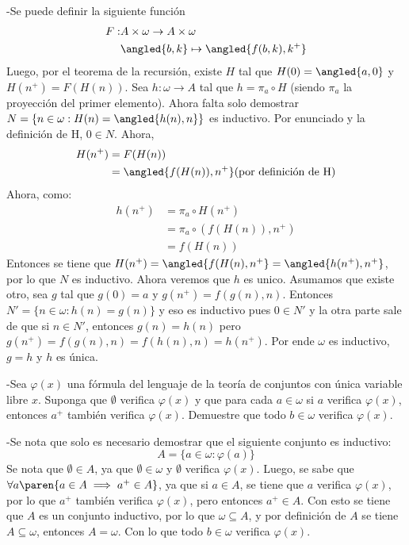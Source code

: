 \begin{sol}
    -Se puede definir la siguiente función
    \begin{align*}
        F: & A\times\omega\rightarrow A\times\omega \\
           & \angled{b,k}\mapsto\angled{f(b,k),k^+} \\
    \end{align*}
    Luego, por el teorema de la recursión, existe \(H\) tal que \(H(0)=\angled{a,0}\) y \(H(n^+)=F(H(n))\). Sea \(h:\omega\rightarrow A\) tal que \(h=\pi_a\circ H\) (siendo \(\pi_a\) la proyección del primer elemento). Ahora falta solo demostrar \(N=\{n\in\omega:H(n)=\angled{h(n),n}\}\) es inductivo. Por enunciado y la definición de H, \(0 \in N\). Ahora,
    \begin{align*}
        H(n^+) & =F(H(n))                                           \\
               & =\angled{f(H(n)),n^+} \text{(por definición de H)}
    \end{align*}
    Ahora, como:
    \begin{align*}
        h(n^+) & = \pi_a\circ H(n^+)        \\
               & = \pi_a\circ (f(H(n)),n^+) \\
               & =f(H(n))
    \end{align*}
    Entonces se tiene que \(H(n^+)=\angled{f(H(n),n^+}=\angled{h(n^+),n^+}\), por lo que \(N\) es inductivo. 
    Ahora veremos que \(h\) es unico. Asumamos que existe otro, sea \(g\) tal que \(g(0)=a\) y \(g(n^+)=f(g(n),n)\). Entonces \(N'=\{n\in\omega:h(n)=g(n)\}\) y eso es inductivo pues \(0 \in N'\) y la otra parte sale de que si \(n \in N'\), entonces \(g(n)=h(n)\) pero \(g(n^+)=f(g(n),n)=f(h(n),n)=h(n^+)\). Por ende \(\omega\) es inductivo, \(g=h\) y \(h\) es única.

\end{sol}

\begin{prob}[Bonus]
    -Sea \(\varphi(x)\) una fórmula del lenguaje de la teoría de conjuntos con única variable libre \(x\). Suponga que \(\emptyset\) verifica \(\varphi(x)\) y que para cada \(a\in\omega\) si \(a\) verifica \(\varphi(x)\), entonces \(a^+\) también verifica \(\varphi(x)\). Demuestre que todo \(b\in\omega\) verifica \(\varphi(x)\).
\end{prob}

\begin{sol}[Bonus]
    -Se nota que solo es necesario demostrar que el siguiente conjunto es inductivo:
    \[
        A=\{a\in\omega:\varphi(a)\}
    \]
    Se nota que \(\emptyset\in A\), ya que \(\emptyset\in\omega\) y \(\emptyset\) verifica \(\varphi(x)\). Luego, se sabe que \(\forall a\paren{a\in A\implies a^+\in A}\), ya que si \(a\in A\), se tiene que \(a\) verifica \(\varphi(x)\), por lo que \(a^+\) también verifica \(\varphi(x)\), pero entonces \(a^+\in A\). Con esto se tiene que \(A\) es un conjunto inductivo, por lo que \(\omega\subseteq A\), y por definición de \(A\) se tiene \(A\subseteq\omega\), entonces \(A=\omega\). Con lo que todo \(b\in\omega\) verifica \(\varphi(x)\).
\end{sol}

